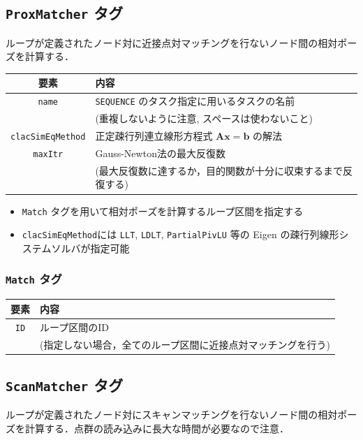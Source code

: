 \documentclass[dvipdfmx]{jsarticle}
\begin{document}
\cprotect \subsection{\verb|ProxMatcher| タグ}
ループが定義されたノード対に近接点対マッチングを行ないノード間の相対ポーズを計算する．

\begin{tabular}{c|l}
	\hline
	要素 & 内容 \\
	\hline \hline
	\verb|name| & \verb|SEQUENCE| のタスク指定に用いるタスクの名前 \vspace{-5pt}\\
		& (重複しないように注意, スペースは使わないこと) \\
	\verb|clacSimEqMethod| & 正定疎行列連立線形方程式 $\bm{A} \bm{x} = \bm{b}$ の解法 \\
	\verb|maxItr| & Gauss-Newton法の最大反復数 \vspace{-5pt}\\
		& (最大反復数に達するか，目的関数が十分に収束するまで反復する) \\
	\hline
\end{tabular}

\begin{itemize}
	\item \verb|Match| タグを用いて相対ポーズを計算するループ区間を指定する
	\item \verb|clacSimEqMethod|には \verb|LLT|, \verb|LDLT|, \verb|PartialPivLU| 等の Eigen の疎行列線形システムソルバが指定可能
\end{itemize}

\cprotect \subsubsection{\verb|Match| タグ}
\begin{tabular}{c|l}
	\hline
	要素 & 内容 \\
	\hline \hline
	\verb|ID| & ループ区間のID \vspace{-5pt}\\
		& (指定しない場合，全てのループ区間に近接点対マッチングを行う) \\
	\hline
\end{tabular}

\cprotect \subsection{\verb|ScanMatcher| タグ}
ループが定義されたノード対にスキャンマッチングを行ないノード間の相対ポーズを計算する．点群の読み込みに長大な時間が必要なので注意．
\end{document}
